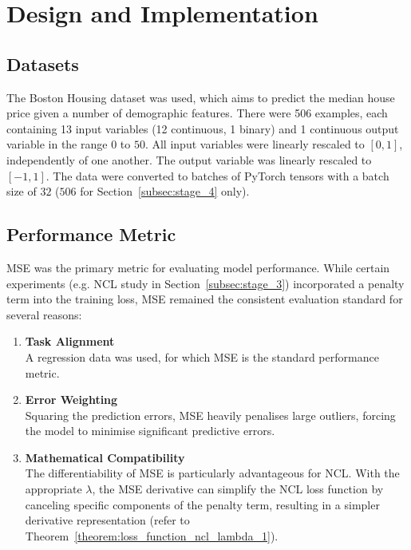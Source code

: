 \section{Design and Implementation}
\label{sec:design}


\subsection{Datasets}
\label{subsec:project_settings_datasets}
The Boston Housing dataset was used, which aims to predict the median house price given a number of demographic features. There were 506 examples, each containing 13 input variables (12 continuous, 1 binary) and 1 continuous output variable in the range $0$ to $50$. All input variables were linearly rescaled to $[0, 1]$, independently of one another. The output variable was linearly rescaled to $[-1, 1]$. The data were converted to batches of PyTorch tensors with a batch size of $32$ ($506$ for Section~\ref{subsec:stage_4} only). 


\subsection{Performance Metric}
MSE was the primary metric for evaluating model performance. While certain experiments (e.g. NCL study in Section~\ref{subsec:stage_3}) incorporated a penalty term into the training loss, MSE remained the consistent evaluation standard for several reasons: 
\begin{enumerate}
    \item \textbf{Task Alignment} \\
    A regression data was used, for which MSE is the standard performance metric. 

    \item \textbf{Error Weighting} \\
    Squaring the prediction errors, MSE heavily penalises large outliers, forcing the model to minimise significant predictive errors. 

    \item \textbf{Mathematical Compatibility} \\
    The differentiability of MSE is particularly advantageous for NCL. With the appropriate $\lambda$, the MSE derivative can simplify the NCL loss function by canceling specific components of the penalty term, resulting in a simpler derivative representation (refer to Theorem~\ref{theorem:loss_function_ncl_lambda_1}). 
\end{enumerate}


